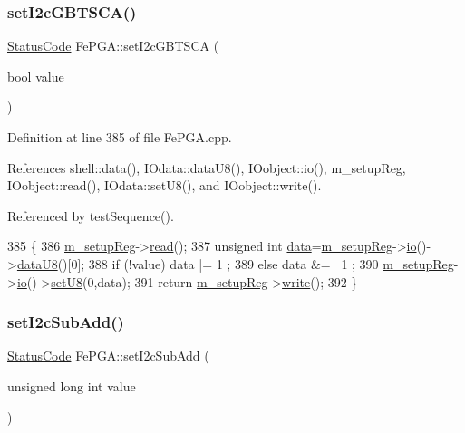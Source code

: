 \subsubsection{\texorpdfstring{set\+I2c\+G\+B\+T\+S\+C\+A()}{setI2cGBTSCA()}}
{\footnotesize\ttfamily \hyperlink{classStatusCode}{Status\+Code} Fe\+P\+G\+A\+::set\+I2c\+G\+B\+T\+S\+CA (\begin{DoxyParamCaption}\item[{bool}]{value }\end{DoxyParamCaption})}



Definition at line 385 of file Fe\+P\+G\+A.\+cpp.



References shell\+::data(), I\+Odata\+::data\+U8(), I\+Oobject\+::io(), m\+\_\+setup\+Reg, I\+Oobject\+::read(), I\+Odata\+::set\+U8(), and I\+Oobject\+::write().



Referenced by test\+Sequence().


\begin{DoxyCode}
385                                           \{
386   \hyperlink{classFePGA_a0255fe229013986b4387c3a75ddf4e97}{m\_setupReg}->\hyperlink{classIOobject_aa07610c11963b1db6710e3c76ceea456}{read}();
387   \textcolor{keywordtype}{unsigned} \textcolor{keywordtype}{int} \hyperlink{namespaceshell_a5ea2525995cedc3efd69ea8a7f034d1e}{data}=\hyperlink{classFePGA_a0255fe229013986b4387c3a75ddf4e97}{m\_setupReg}->\hyperlink{classIOobject_af04fb94137c3d86849f478ac5afab5d1}{io}()->\hyperlink{classIOdata_a75e9c318dbac3a39402179070943d4bc}{dataU8}()[0];
388   \textcolor{keywordflow}{if} (!value) data |= 1  ;
389   \textcolor{keywordflow}{else}        data &= ~1 ;
390   \hyperlink{classFePGA_a0255fe229013986b4387c3a75ddf4e97}{m\_setupReg}->\hyperlink{classIOobject_af04fb94137c3d86849f478ac5afab5d1}{io}()->\hyperlink{classIOdata_a6c4fb2f2af01889ada889c2b7aceb24d}{setU8}(0,data);
391   \textcolor{keywordflow}{return} \hyperlink{classFePGA_a0255fe229013986b4387c3a75ddf4e97}{m\_setupReg}->\hyperlink{classIOobject_a9f6984bc9f0fadcf800f1be2523ac744}{write}();
392 \}
\end{DoxyCode}
\mbox{\label{classFePGA_a37c1ee5bf89667c641f321479697166f}} 
\subsubsection{\texorpdfstring{set\+I2c\+Sub\+Add()}{setI2cSubAdd()}}
{\footnotesize\ttfamily \hyperlink{classStatusCode}{Status\+Code} Fe\+P\+G\+A\+::set\+I2c\+Sub\+Add (\begin{DoxyParamCaption}\item[{unsigned long int}]{value }\end{DoxyParamCaption})}



